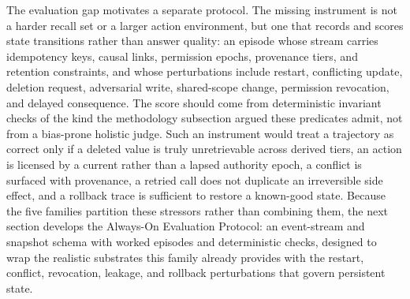 The evaluation gap motivates a separate protocol. The missing instrument is not a harder recall set or a larger action environment, but one that records and scores state transitions rather than answer quality: an episode whose stream carries idempotency keys, causal links, permission epochs, provenance tiers, and retention constraints, and whose perturbations include restart, conflicting update, deletion request, adversarial write, shared-scope change, permission revocation, and delayed consequence. The score should come from deterministic invariant checks of the kind the methodology subsection argued these predicates admit, not from a bias-prone holistic judge. Such an instrument would treat a trajectory as correct only if a deleted value is truly unretrievable across derived tiers, an action is licensed by a current rather than a lapsed authority epoch, a conflict is surfaced with provenance, a retried call does not duplicate an irreversible side effect, and a rollback trace is sufficient to restore a known-good state. Because the five families partition these stressors rather than combining them, the next section develops the Always-On Evaluation Protocol: an event-stream and snapshot schema with worked episodes and deterministic checks, designed to wrap the realistic substrates this family already provides with the restart, conflict, revocation, leakage, and rollback perturbations that govern persistent state.
